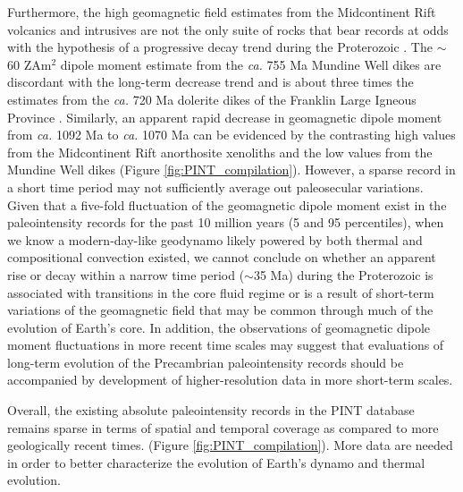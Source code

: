 \documentclass[draft]{agujournal2019}
\begin{document}
Furthermore, the high geomagnetic field estimates from the Midcontinent Rift volcanics and intrusives are not the only suite of rocks that bear records at odds with the hypothesis of a progressive decay trend during the Proterozoic \cite{Biggin2009a, Bono2019a}. The $\sim$60 ZAm$^2$ dipole moment estimate from the \textit{ca.} 755 Ma Mundine Well dikes are discordant with the long-term decrease trend \cite{Bono2019a} and is about three times the estimates from the \textit{ca.} 720 Ma dolerite dikes of the Franklin Large Igneous Province \cite{Lloyd2021a}. Similarly, an apparent rapid decrease in geomagnetic dipole moment from \textit{ca.} 1092 Ma to \textit{ca.} 1070 Ma can be evidenced by the contrasting high values from the Midcontinent Rift anorthosite xenoliths and the low values from the Mundine Well dikes (Figure \ref{fig:PINT_compilation}). However, a sparse record in a short time period may not sufficiently average out paleosecular variations. Given that a five-fold fluctuation of the geomagnetic dipole moment exist in the paleointensity records for the past 10 million years (5 and 95 percentiles), when we know a modern-day-like geodynamo likely powered by both thermal and compositional convection existed, we cannot conclude on whether an apparent rise or decay within a narrow time period ($\sim$35 Ma) during the Proterozoic is associated with transitions in the core fluid regime or is a result of short-term variations of the geomagnetic field that may be common through much of the evolution of Earth's core. In addition, the observations of geomagnetic dipole moment fluctuations in more recent time scales may suggest that evaluations of long-term evolution of the Precambrian paleointensity records should be accompanied by development of higher-resolution data in more short-term scales. 

Overall, the existing absolute paleointensity records in the PINT database remains sparse in terms of spatial and temporal coverage as compared to more geologically recent times. (Figure \ref{fig:PINT_compilation}). More data are needed in order to better characterize the evolution of Earth's dynamo and thermal evolution. 



\end{document}
